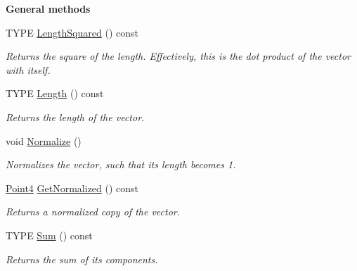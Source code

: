 \begin{Indent}\textbf{ General methods}\par
\begin{DoxyCompactItemize}
\item 
\mbox{\label{classcy_1_1_point4_a595bbb930efdbf2224c13dbc52fbe3e0}} 
T\+Y\+PE \mbox{\hyperlink{classcy_1_1_point4_a595bbb930efdbf2224c13dbc52fbe3e0}{Length\+Squared}} () const
\begin{DoxyCompactList}\small\item\em Returns the square of the length. Effectively, this is the dot product of the vector with itself. \end{DoxyCompactList}\item 
\mbox{\label{classcy_1_1_point4_acf90aa47ed2d91a14acaaed9bdbe8a7d}} 
T\+Y\+PE \mbox{\hyperlink{classcy_1_1_point4_acf90aa47ed2d91a14acaaed9bdbe8a7d}{Length}} () const
\begin{DoxyCompactList}\small\item\em Returns the length of the vector. \end{DoxyCompactList}\item 
\mbox{\label{classcy_1_1_point4_af9ec37cb472224a4f7d2e479aaefee2f}} 
void \mbox{\hyperlink{classcy_1_1_point4_af9ec37cb472224a4f7d2e479aaefee2f}{Normalize}} ()
\begin{DoxyCompactList}\small\item\em Normalizes the vector, such that its length becomes 1. \end{DoxyCompactList}\item 
\mbox{\label{classcy_1_1_point4_a02c375e3506cd45258f9857e32fa3bef}} 
\mbox{\hyperlink{classcy_1_1_point4}{Point4}} \mbox{\hyperlink{classcy_1_1_point4_a02c375e3506cd45258f9857e32fa3bef}{Get\+Normalized}} () const
\begin{DoxyCompactList}\small\item\em Returns a normalized copy of the vector. \end{DoxyCompactList}\item 
\mbox{\label{classcy_1_1_point4_ad942a70a12dff276db6dfc0e883a9ed7}} 
T\+Y\+PE \mbox{\hyperlink{classcy_1_1_point4_ad942a70a12dff276db6dfc0e883a9ed7}{Sum}} () const
\begin{DoxyCompactList}\small\item\em Returns the sum of its components. \end{DoxyCompactList}\item 

\end{DoxyCompactItemize}
\end{Indent}

